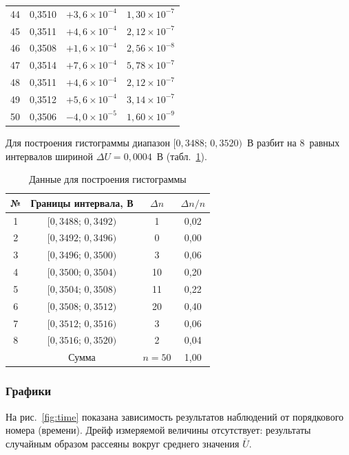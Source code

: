 \documentclass[12pt,a4paper]{article}
\begin{document}
\begin{longtable}{cccc}
44 & 0,3510 & $+3{,}6\times10^{-4}$  & $1{,}30\times10^{-7}$ \\
45 & 0,3511 & $+4{,}6\times10^{-4}$  & $2{,}12\times10^{-7}$ \\
46 & 0,3508 & $+1{,}6\times10^{-4}$  & $2{,}56\times10^{-8}$ \\
47 & 0,3514 & $+7{,}6\times10^{-4}$  & $5{,}78\times10^{-7}$ \\
48 & 0,3511 & $+4{,}6\times10^{-4}$  & $2{,}12\times10^{-7}$ \\
49 & 0,3512 & $+5{,}6\times10^{-4}$  & $3{,}14\times10^{-7}$ \\
50 & 0,3506 & $-4{,}0\times10^{-5}$  & $1{,}60\times10^{-9}$ \\
\end{longtable}

Для построения гистограммы диапазон $[0{,}3488;\, 0{,}3520)$~В разбит на
8~равных интервалов шириной $\Delta U = 0{,}0004$~В (табл.~\ref{tab:hist}).

\begin{table}[h]
\centering
\caption{Данные для построения гистограммы}
\label{tab:hist}
\begin{tabular}{cccc}
\toprule
№ & Границы интервала, В & $\Delta n$ & $\Delta n / n$ \\
\midrule
1 & $[0{,}3488;\, 0{,}3492)$ & 1  & 0,02 \\
2 & $[0{,}3492;\, 0{,}3496)$ & 0  & 0,00 \\
3 & $[0{,}3496;\, 0{,}3500)$ & 3  & 0,06 \\
4 & $[0{,}3500;\, 0{,}3504)$ & 10 & 0,20 \\
5 & $[0{,}3504;\, 0{,}3508)$ & 11 & 0,22 \\
6 & $[0{,}3508;\, 0{,}3512)$ & 20 & 0,40 \\
7 & $[0{,}3512;\, 0{,}3516)$ & 3  & 0,06 \\
8 & $[0{,}3516;\, 0{,}3520)$ & 2  & 0,04 \\
\midrule
  & Сумма & $n = 50$ & 1,00 \\
\bottomrule
\end{tabular}
\end{table}

\subsubsection{Графики}

На рис.~\ref{fig:time} показана зависимость результатов наблюдений от порядкового
номера (времени). Дрейф измеряемой величины отсутствует: результаты случайным
образом рассеяны вокруг среднего значения $\bar{U}$.
\end{document}
